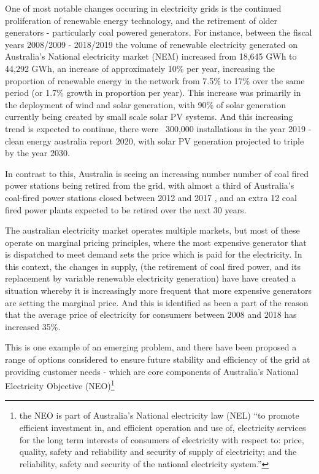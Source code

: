 One of most notable changes occuring in electricity grids is the continued proliferation of renewable energy technology, and the retirement of older generators - particularly coal powered generators.
For instance, between the fiscal years 2008/2009 - 2018/2019 the volume of renewable electricity generated on Australia's National electricity market (NEM) increased from 18,645 GWh to 44,292 GWh, an increase of approximately 10\% per year, increasing the proportion of renewable energy in the network from 7.5\% to 17\% over the same period (or 1.7\% growth in proportion per year).
\cite{departmentoftheenvironmentenergy2018}
This increase was primarily in the deployment of wind and solar generation, with 90\% of solar generation currently being created by small scale solar PV systems.
And this increasing trend is expected to continue, there were ~300,000 installations in the year 2019 - clean energy australia report 2020, with solar PV generation projected to triple by the year 2030.\cite{australianenergymarketoperatorlimited2018}

In contrast to this, Australia is seeing an increasing number number of coal fired power stations being retired from the grid,
with almost a third of Australia's coal-fired power stations closed between 2012 and 2017 \cite{doi:10.1111/1467-8489.12289},
and an extra 12 coal fired power plants expected to be retired over the next 30 years.\cite{australianenergymarketoperatorlimited2018}

The australian electricity market operates multiple markets, but most of these operate on marginal pricing principles, where the most expensive generator that is dispatched to meet demand sets the price which is paid for the electricity.
In this context, the changes in supply, (the retirement of coal fired power, and its replacement by variable renewable electricity generation) have have created a situation whereby it is increasingly more frequent that more expensive generators are setting the marginal price.
And this is identified as been a part of the reason that the average price of electricity for consumers between 2008 and 2018 has increased 35\%. \cite{australiancompetitionconsumercommission2018}

This is one example of an emerging problem, and there have been proposed a range of options considered to ensure future stability and efficiency of the grid at providing customer needs - which are core components of Australia's National Electricity Objective (NEO)\footnote{the NEO is part of Australia's National electricity law (NEL) ``to promote efficient investment in, and efficient operation and use of, electricity services for the long term interests of consumers of electricity with respect to: price, quality, safety and reliability and security of supply of electricity; and the reliability, safety and security of the national electricity system.''}

